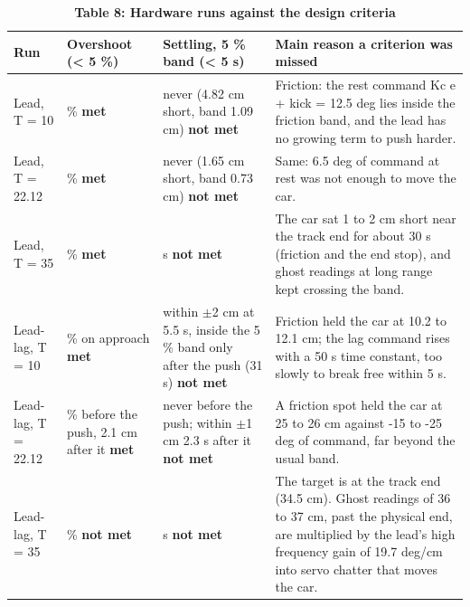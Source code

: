 \documentclass[11pt,a4paper]{article}
\begin{document}
\begin{table}[H]\centering\small
\caption*{\textbf{Table 8: Hardware runs against the design criteria}}
\renewcommand{\arraystretch}{1.25}
\begin{tabular}{@{}>{\raggedright\arraybackslash}p{2.1cm}>{\raggedright\arraybackslash}p{2.6cm}>{\raggedright\arraybackslash}p{3.3cm}>{\raggedright\arraybackslash}p{6.7cm}@{}}
\toprule
\textbf{Run} & \textbf{Overshoot (< 5 \%)} & \textbf{Settling, 5 \% band (< 5 s)} & \textbf{Main reason a criterion was missed} \\
\midrule
Lead, T = 10 & 0 \% \newline \textbf{met} & never (4.82 cm short, band 1.09 cm) \newline \textbf{not met} & Friction: the rest command Kc e + kick = 12.5 deg lies inside the friction band, and the lead has no growing term to push harder. \\
Lead, T = 22.12 & 0 \% \newline \textbf{met} & never (1.65 cm short, band 0.73 cm) \newline \textbf{not met} & Same: 6.5 deg of command at rest was not enough to move the car. \\
Lead, T = 35 & 2.6 \% \newline \textbf{met} & 35 s \newline \textbf{not met} & The car sat 1 to 2 cm short near the track end for about 30 s (friction and the end stop), and ghost readings at long range kept crossing the band. \\
Lead-lag, T = 10 & 0 \% on approach \newline \textbf{met} & within $\pm$2 cm at 5.5 s, inside the 5 \% band only after the push (31 s) \newline \textbf{not met} & Friction held the car at 10.2 to 12.1 cm; the lag command rises with a 50 s time constant, too slowly to break free within 5 s. \\
Lead-lag, T = 22.12 & 0 \% before the push, 2.1 cm after it \newline \textbf{met} & never before the push; within $\pm$1 cm 2.3 s after it \newline \textbf{not met} & A friction spot held the car at 25 to 26 cm against -15 to -25 deg of command, far beyond the usual band. \\
Lead-lag, T = 35 & 6.2 \% \newline \textbf{not met} & 13 s \newline \textbf{not met} & The target is at the track end (34.5 cm). Ghost readings of 36 to 37 cm, past the physical end, are multiplied by the lead's high frequency gain of 19.7 deg/cm into servo chatter that moves the car. \\
\bottomrule
\end{tabular}
\end{table}
\end{document}
